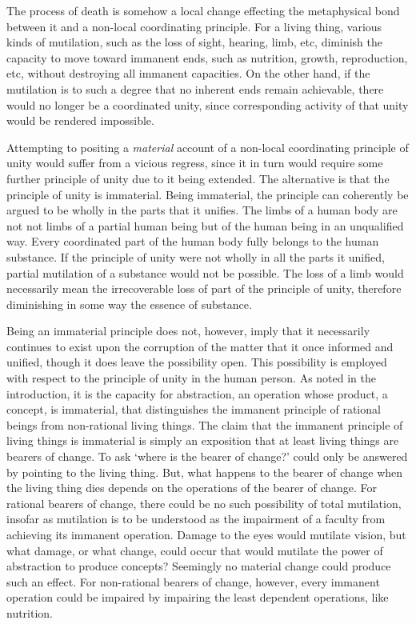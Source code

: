 The process of death is somehow a local change effecting the metaphysical bond between it and a non-local coordinating principle. For a living thing, various kinds of mutilation, such as the loss of sight, hearing, limb, etc, diminish the capacity to move toward immanent ends, such as nutrition, growth, reproduction, etc, without destroying all immanent capacities. On the other hand, if the mutilation is to such a degree that no inherent ends remain achievable, there would no longer be a coordinated unity, since corresponding activity of that unity would be rendered impossible.

Attempting to positing a \emph{material} account of a non-local coordinating principle of unity would suffer from a vicious regress, since it in turn would require some further principle of unity due to it being extended. The alternative is that the principle of unity is immaterial. Being immaterial, the principle can coherently be argued to be wholly in the parts that it unifies. The limbs of a human body are not not limbs of a partial human being but of the human being in an unqualified way. Every coordinated part of the human body fully belongs to the human substance. If the principle of unity were not wholly in all the parts it unified, partial mutilation of a substance would not be possible. The loss of a limb would necessarily mean the irrecoverable loss of part of the principle of unity, therefore diminishing in some way the essence of substance.

Being an immaterial principle does not, however, imply that it necessarily continues to exist upon the corruption of the matter that it once informed and unified, though it does leave the possibility open. This possibility is employed with respect to the principle of unity in the human person. As noted in the introduction, it is the capacity for abstraction, an operation whose product, a concept, is immaterial, that distinguishes the immanent principle of rational beings from non-rational living things. The claim that the immanent principle of living things is immaterial is simply an exposition that at least living things are bearers of change. To ask `where is the bearer of change?' could only be answered by pointing to the living thing. But, what happens to the bearer of change when the living thing dies depends on the operations of the bearer of change. For rational bearers of change, there could be no such possibility of total mutilation, insofar as mutilation is to be understood as the impairment of a faculty from achieving its immanent operation. Damage to the eyes would mutilate vision, but what damage, or what change, could occur that would mutilate the power of abstraction to produce concepts? Seemingly no material change could produce such an effect. For non-rational bearers of change, however, every immanent operation could be impaired by impairing the least dependent operations, like nutrition.


